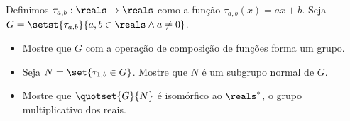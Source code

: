 \begin{exercise}
Definimos $\tau_{a,b} : \reals \to \reals$ como a função $\tau_{a,b}(x) = ax + b$.
Seja $G = \setst{\tau_{a,b}}{a, b \in \reals \wedge a \not = 0}$.
	\begin{itemize}
		\item Mostre que $G$ com a operação de composição de funções forma um grupo.
		\item Seja $N = \set{ \tau_{1,b} \in G }$. Mostre que $N$ é um subgrupo normal de $G$.
		\item Mostre que $\quotset{G}{N}$ é isomórfico ao $\reals^*$, o grupo multiplicativo dos reais.
	\end{itemize}
\end{exercise}